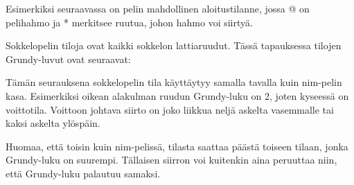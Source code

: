 Esimerkiksi seuraavassa on pelin mahdollinen aloitustilanne,
jossa @ on pelihahmo ja * merkitsee ruutua, johon hahmo voi siirtyä.

\begin{center}
\end{center}

Sokkelopelin tiloja ovat kaikki sokkelon
lattiaruudut. Tässä tapauksessa
tilojen Grundy-luvut ovat seuraavat:

\begin{center}
\end{center}

Tämän seurauksena sokkelopelin
tila käyttäytyy
samalla tavalla kuin nim-pelin kasa.
Esimerkiksi oikean alakulman ruudun
Grundy-luku on 2,
joten kyseessä on voittotila.
Voittoon johtava siirto on joko liikkua neljä
askelta vasemmalle tai kaksi askelta ylöspäin.

Huomaa, että toisin kuin nim-pelissä,
tilasta saattaa päästä toiseen tilaan,
jonka Grundy-luku on suurempi.
Tällaisen siirron voi kuitenkin
aina peruuttaa niin,
että Grundy-luku palautuu samaksi.

